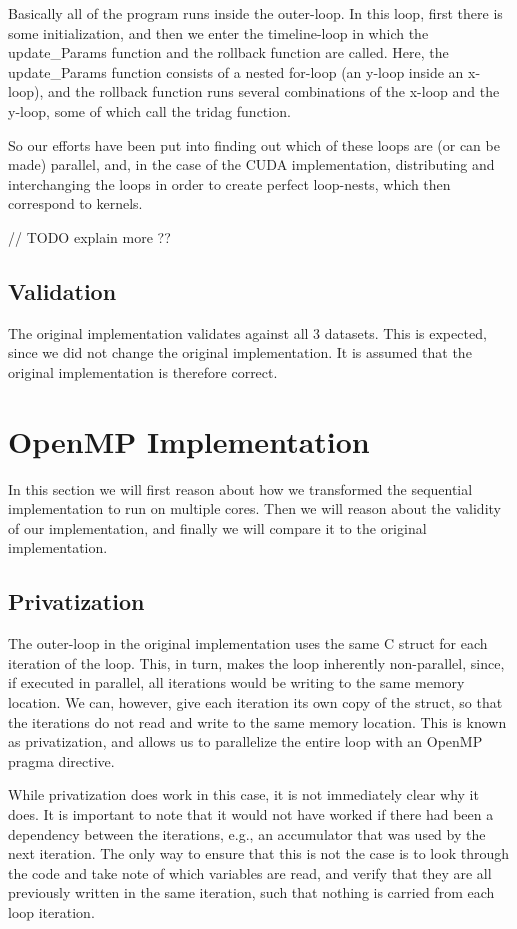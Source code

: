 \documentclass[11pt]{article}
\begin{document}
Basically all of the program runs inside the outer-loop.
In this loop, first there is some initialization, and then we enter the timeline-loop in which the update\_Params function and the rollback function are called.
Here, the update\_Params function consists of a nested for-loop (an y-loop inside an x-loop), and the rollback function runs several combinations of the x-loop and the y-loop, some of which call the tridag function.

So our efforts have been put into finding out which of these loops are (or can be made) parallel, and, in the case of the CUDA implementation, distributing and interchanging the loops in order to create perfect loop-nests, which then correspond to kernels.

// TODO explain more ??

\subsection{Validation}
The original implementation validates against all 3 datasets. This is expected,
since we did not change the original implementation. It is assumed that the 
original implementation is therefore correct.


\section{OpenMP Implementation}
In this section we will first reason about how we transformed the sequential
implementation to run on multiple cores. Then we will reason about the validity 
of our implementation, and finally we will compare it to the original 
implementation.

\subsection{Privatization}
The outer-loop in the original implementation uses the same C 
struct for each
iteration of the loop. This, in turn, makes the loop inherently non-parallel, since,
if executed in parallel, all iterations would be writing to the same memory location. 
We can, however, give each iteration its own copy of the
struct, so that the iterations do not read and write to the same memory location. This is 
known as privatization, and allows us to parallelize the entire loop
with an OpenMP pragma directive. 

While privatization does work in this case, it is not immediately clear why it does. It is
important to note that it would not have worked if there had been a dependency between the iterations,
e.g., an accumulator that was used by the next iteration. The only way to ensure
that this is not the case is to look through the code and take note of which 
variables are read, and verify that they are all previously written in the 
same iteration, such that nothing is carried from each loop iteration.
\end{document}
